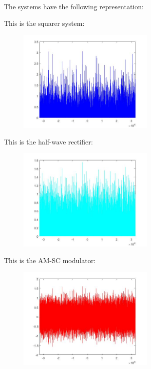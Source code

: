 \documentclass[a4paper,11pt]{article}
\begin{document}
\newpage

The systems have the following representation:

This is the squarer system:

\begin{figure}[!hp]
    \begin{center}
    \includegraphics[width=0.6\textwidth]{images/lab3_figure2_1.jpg}
    \end{center}
\end{figure}

This is the half-wave rectifier:

\begin{figure}[!hp]
    \begin{center}
    \includegraphics[width=0.6\textwidth]{images/lab3_figure2_2.jpg}
    \end{center}
\end{figure}

\newpage

This is the AM-SC modulator:

\begin{figure}[!hp]
    \begin{center}
    \includegraphics[width=0.6\textwidth]{images/lab3_figure2_3.jpg}
    \end{center}
\end{figure}
\end{document}
